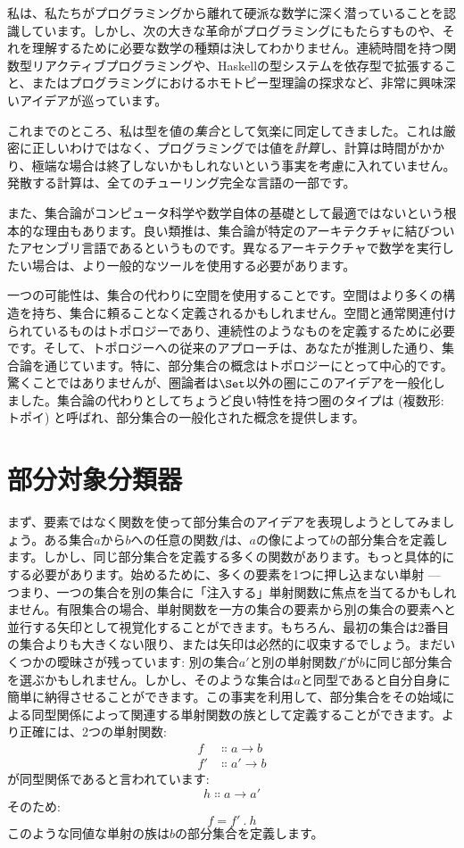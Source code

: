 
\lettrine[lhang=0.17]{私}{は}、私たちがプログラミングから離れて硬派な数学に深く潜っていることを認識しています。しかし、次の大きな革命がプログラミングにもたらすものや、それを理解するために必要な数学の種類は決してわかりません。連続時間を持つ関数型リアクティブプログラミングや、Haskellの型システムを依存型で拡張すること、またはプログラミングにおけるホモトピー型理論の探求など、非常に興味深いアイデアが巡っています。

これまでのところ、私は型を値の\emph{集合}として気楽に同定してきました。これは厳密に正しいわけではなく、プログラミングでは値を\emph{計算}し、計算は時間がかかり、極端な場合は終了しないかもしれないという事実を考慮に入れていません。発散する計算は、全てのチューリング完全な言語の一部です。

また、集合論がコンピュータ科学や数学自体の基礎として最適ではないという根本的な理由もあります。良い類推は、集合論が特定のアーキテクチャに結びついたアセンブリ言語であるというものです。異なるアーキテクチャで数学を実行したい場合は、より一般的なツールを使用する必要があります。

一つの可能性は、集合の代わりに空間を使用することです。空間はより多くの構造を持ち、集合に頼ることなく定義されるかもしれません。空間と通常関連付けられているものはトポロジーであり、連続性のようなものを定義するために必要です。そして、トポロジーへの従来のアプローチは、あなたが推測した通り、集合論を通じています。特に、部分集合の概念はトポロジーにとって中心的です。驚くことではありませんが、圏論者は\(\Set\)以外の圏にこのアイデアを一般化しました。集合論の代わりとしてちょうど良い特性を持つ圏のタイプは (複数形: トポイ) と呼ばれ、部分集合の一般化された概念を提供します。

\section{部分対象分類器}

まず、要素ではなく関数を使って部分集合のアイデアを表現しようとしてみましょう。ある集合\(a\)から\(b\)への任意の関数\(f\)は、\(a\)の像によって\(b\)の部分集合を定義します。しかし、同じ部分集合を定義する多くの関数があります。もっと具体的にする必要があります。始めるために、多くの要素を1つに押し込まない単射 --- つまり、一つの集合を別の集合に「注入する」単射関数に焦点を当てるかもしれません。有限集合の場合、単射関数を一方の集合の要素から別の集合の要素へと並行する矢印として視覚化することができます。もちろん、最初の集合は2番目の集合よりも大きくない限り、または矢印は必然的に収束するでしょう。まだいくつかの曖昧さが残っています: 別の集合\(a'\)と別の単射関数\(f'\)が\(b\)に同じ部分集合を選ぶかもしれません。しかし、そのような集合は\(a\)と同型であると自分自身に簡単に納得させることができます。この事実を利用して、部分集合をその始域による同型関係によって関連する単射関数の族として定義することができます。より正確には、2つの単射関数: 
\begin{align*}
  f  & \Colon a \to b  \\
  f' & \Colon a' \to b
\end{align*}
が同型関係であると言われています: 
\[h \Colon a \to a'\]
そのため: 
\[f = f'\ .\ h\]
このような同値な単射の族は\(b\)の部分集合を定義します。

